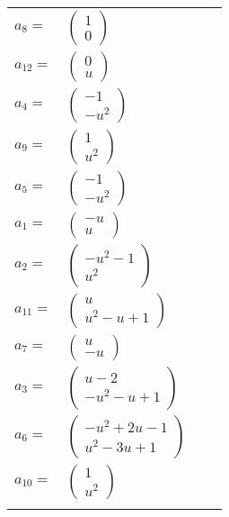 \documentclass[1p]{elsarticle_modified}
\theoremstyle{definition}
\begin{document}
\begin{tabular}{m{7pt} m{180pt} m{7pt} m{180pt} }
\flushright $a_{8}=$&$\begin{pmatrix}1\\0\end{pmatrix}$ \\
\flushright $a_{12}=$&$\begin{pmatrix}0\\u\end{pmatrix}$ \\
\flushright $a_{4}=$&$\begin{pmatrix}-1\\- u^2\end{pmatrix}$ \\
\flushright $a_{9}=$&$\begin{pmatrix}1\\u^2\end{pmatrix}$ \\
\flushright $a_{5}=$&$\begin{pmatrix}-1\\- u^2\end{pmatrix}$ \\
\flushright $a_{1}=$&$\begin{pmatrix}- u\\u\end{pmatrix}$ \\
\flushright $a_{2}=$&$\begin{pmatrix}- u^2-1\\u^2\end{pmatrix}$ \\
\flushright $a_{11}=$&$\begin{pmatrix}u\\u^2- u+1\end{pmatrix}$ \\
\flushright $a_{7}=$&$\begin{pmatrix}u\\- u\end{pmatrix}$ \\
\flushright $a_{3}=$&$\begin{pmatrix}u-2\\- u^2- u+1\end{pmatrix}$ \\
\flushright $a_{6}=$&$\begin{pmatrix}- u^2+2 u-1\\u^2-3 u+1\end{pmatrix}$ \\
\flushright $a_{10}=$&$\begin{pmatrix}1\\u^2\end{pmatrix}$\\&\end{tabular}
\end{document}
